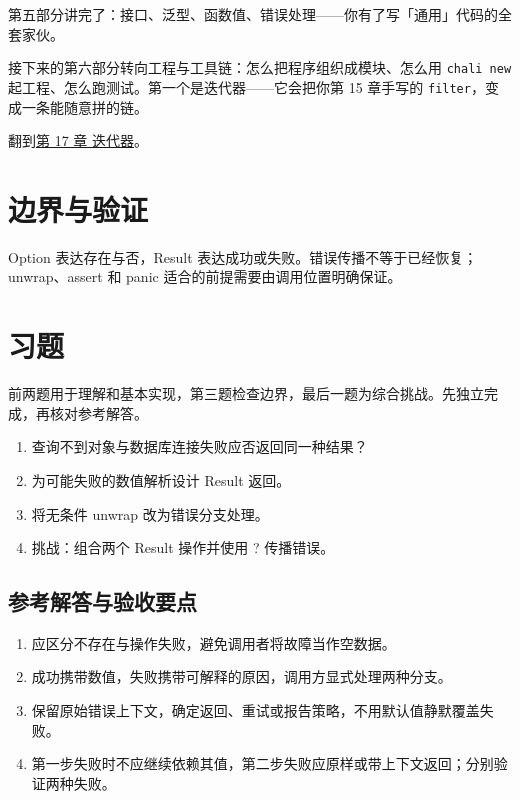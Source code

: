 第五部分讲完了：接口、泛型、函数值、错误处理——你有了写「通用」代码的全套家伙。

接下来的第六部分转向工程与工具链：怎么把程序组织成模块、怎么用 \texttt{chali new} 起工程、怎么跑测试。第一个是迭代器——它会把你第 15 章手写的 \texttt{filter}，变成一条能随意拼的链。

翻到\hyperref[ch:17]{第 17 章 迭代器}。

\section{边界与验证}

Option 表达存在与否，Result 表达成功或失败。错误传播不等于已经恢复；unwrap、assert 和 panic 适合的前提需要由调用位置明确保证。

\section{习题}

前两题用于理解和基本实现，第三题检查边界，最后一题为综合挑战。先独立完成，再核对参考解答。

\begin{enumerate}

\item 查询不到对象与数据库连接失败应否返回同一种结果？

\item 为可能失败的数值解析设计 Result 返回。

\item 将无条件 unwrap 改为错误分支处理。

\item 挑战：组合两个 Result 操作并使用 ? 传播错误。

\end{enumerate}

\subsection*{参考解答与验收要点}

\begin{enumerate}

\item 应区分不存在与操作失败，避免调用者将故障当作空数据。

\item 成功携带数值，失败携带可解释的原因，调用方显式处理两种分支。

\item 保留原始错误上下文，确定返回、重试或报告策略，不用默认值静默覆盖失败。

\item 第一步失败时不应继续依赖其值，第二步失败应原样或带上下文返回；分别验证两种失败。

\end{enumerate}

